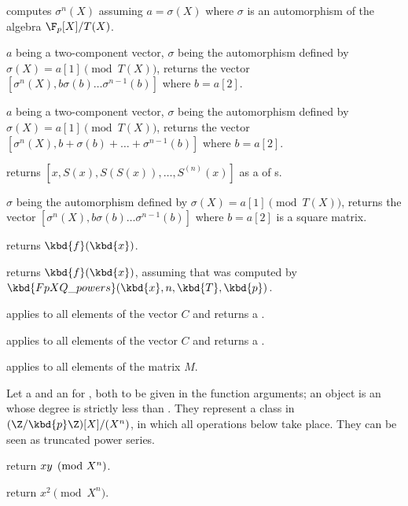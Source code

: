  computes $\sigma^n(X)$
assuming $a=\sigma(X)$ where $\sigma$ is an automorphism of the algebra
$\F_p[X]/T(X)$.

$a$ being a two-component vector,
$\sigma$ being the automorphism defined by $\sigma(X)=a[1]\pmod{T(X)}$,
returns the vector $[\sigma^n(X),b\sigma(b)\ldots\sigma^{n-1}(b)]$
where $b=a[2]$.

$a$ being a two-component vector,
$\sigma$ being the automorphism defined by $\sigma(X)=a[1]\pmod{T(X)}$,
returns the vector $[\sigma^n(X),b+\sigma(b)+\ldots+\sigma^{n-1}(b)]$
where $b=a[2]$.

 returns
$[x,S(x),S(S(x)),\dots,S^{(n)}(x)]$ as a  of s.

$\sigma$ being the automorphism defined by $\sigma(X)=a[1]\pmod{T(X)}$,
returns the vector $[\sigma^n(X),b\sigma(b)\ldots\sigma^{n-1}(b)]$
where $b=a[2]$ is a square matrix.

 returns
$\kbd{f}(\kbd{x})$.

 returns
$\kbd{f}(\kbd{x})$, assuming that  was computed by
$\kbd{FpXQ\_powers}(\kbd{x}, n, \kbd{T}, \kbd{p})$.

 applies
 to all elements of the vector $C$
and returns a .

 applies
 to all elements of the vector $C$
and returns a .

 applies
 to all elements of the matrix $M$.

 Let  a  and  an
 for , both to be given in the function arguments; an 
object is an  whose degree is strictly less than .
They represent a class in $(\Z/\kbd{p}\Z)[X] / (X^n)$, in which all operations
below take place. They can be seen as truncated power series.

 return $x\*y\pmod{X^n}$.

 return $x^2\pmod{X^n}$.

